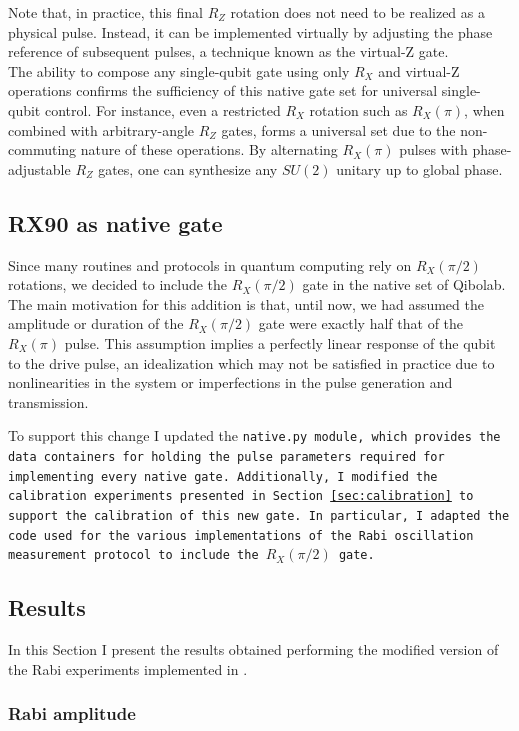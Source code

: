 Note that, in practice, this final $R_Z$ rotation does not need to be realized as a physical pulse. 
Instead, it can be implemented virtually by adjusting the phase reference of subsequent pulses, a technique known as the virtual-Z gate\cite{McKay_2017}. \\
The ability to compose any single-qubit gate using only $R_X$ and virtual-Z operations \cite{boykin1999universalfaulttolerantquantumcomputing} confirms the sufficiency of this native gate set for universal single-qubit control. For instance, even a restricted $ R_X $ rotation such as $ R_X(\pi) $, when combined with arbitrary-angle $ R_Z $ gates, forms a universal set due to the non-commuting nature of these operations.
By alternating $ R_X(\pi) $ pulses with phase-adjustable $ R_Z $ gates, one can synthesize any $SU(2)$ unitary up to global phase.

\subsection{RX90 as native gate}
Since many routines and protocols in quantum computing rely on $R_X(\pi/2)$ rotations, we decided to include the $R_X(\pi/2)$ gate in the native set of Qibolab.
The main motivation for this addition is that, until now, we had assumed the amplitude or duration of the $R_X(\pi/2)$ gate were exactly half that of the $R_X(\pi)$ pulse.
This assumption implies a perfectly linear response of the qubit to the drive pulse, an idealization which may not be satisfied in practice due to nonlinearities in the system or imperfections in the pulse generation and transmission.

To support this change I updated the \tt{native.py} module, which provides the data containers for holding the pulse parameters required for implementing every native gate.
Additionally, I modified the calibration experiments presented in Section \ref{sec:calibration} to support the calibration of this new gate.
In particular, I adapted the code used for the various implementations of the Rabi oscillation measurement protocol to include the $R_X(\pi/2)$ gate.

\subsection{Results}
In this Section I present the results obtained performing the modified version of the Rabi experiments implemented in \Qibocal.

\subsubsection{Rabi amplitude}

